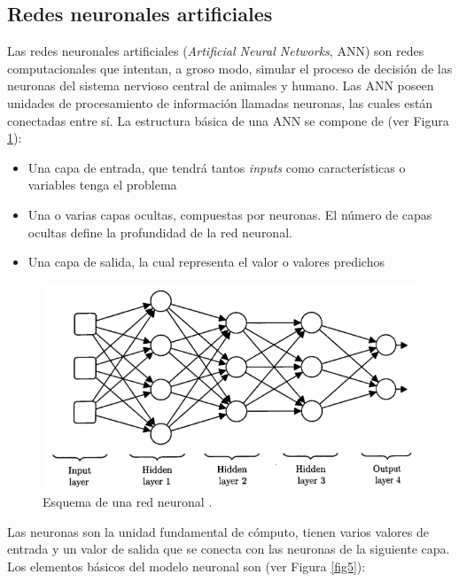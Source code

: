 \subsection{Redes neuronales artificiales}
Las redes neuronales artificiales (\textit{Artificial Neural Networks}, ANN) \cite{24, 25, 27} son redes computacionales que intentan, a groso modo, simular el proceso de decisión de las neuronas del sistema nervioso central de animales y humano. Las ANN poseen unidades de procesamiento de información llamadas neuronas, las cuales están conectadas entre sí. La estructura básica de una ANN se compone de (ver Figura \ref{fig4}):
\begin{itemize}
	\item Una capa de entrada, que tendrá tantos \textit{inputs} como características o variables tenga el problema
	\item Una o varias capas ocultas, compuestas por neuronas. El número de capas ocultas define la profundidad de la red neuronal.
	\item Una capa de salida, la cual representa el valor o valores predichos
\end{itemize} 

\begin{figure}[h]
	\centering
	\includegraphics[scale=0.5]{imagenes/cap2/neural-network.png}
	\caption[Esquema de red neuronal.]{Esquema de una red neuronal \cite{26}.}
	\label{fig4}
\end{figure}

Las neuronas son la unidad fundamental de cómputo, tienen varios valores de entrada y un valor de salida que se conecta con las neuronas de la siguiente capa. Los elementos básicos del modelo neuronal son (ver Figura \ref{fig5}):

